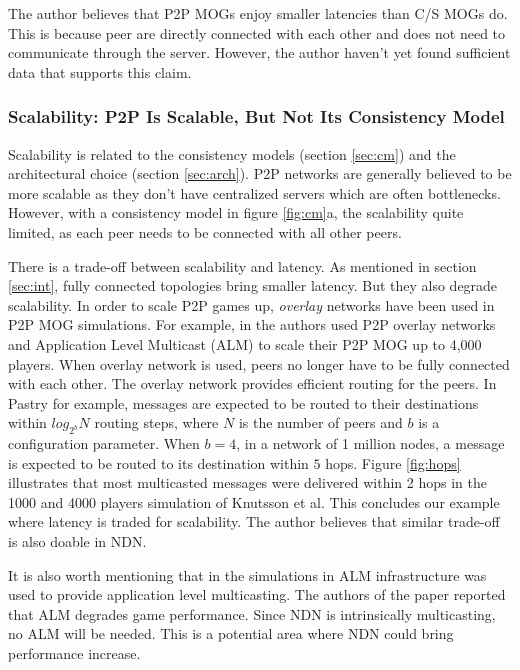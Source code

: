\documentclass{article}
\begin{document}
The author believes that P2P MOGs enjoy smaller latencies than C/S MOGs do. This is because peer are directly connected with each other and does not need to communicate through the server. However, the author haven't yet found sufficient data that supports this claim. 

\subsubsection{Scalability: P2P Is Scalable, But Not Its Consistency Model}
\label{sec:scl}
Scalability is related to the consistency models (section \ref{sec:cm}) and the architectural choice (section \ref{sec:arch}). P2P networks are generally believed to be more scalable as they don't have centralized servers which are often bottlenecks. However, with a consistency model in figure \ref{fig:cm}a, the scalability quite limited, as each peer needs to be connected with all other peers. 

There is a trade-off between scalability and latency. As mentioned in section \ref{sec:int}, fully connected topologies bring smaller latency. But they also degrade scalability. In order to scale P2P games up, \emph{overlay} networks have been used in P2P MOG simulations. For example, in \cite{Knutsson04} the authors used P2P overlay networks and Application Level Multicast (ALM) to scale their P2P MOG up to 4,000 players. When overlay network is used, peers no longer have to be fully connected with each other. The overlay network provides efficient routing for the peers. In Pastry \cite{Lua04} for example, messages are expected to be routed to their destinations within $log_{2^b}N$ routing steps, where $N$ is the number of peers and $b$ is a configuration parameter. When $b = 4$, in a network of 1 million nodes, a message is expected to be routed to its destination within $5$ hops. Figure \ref{fig:hops} illustrates that most multicasted messages were delivered within 2 hops in the 1000 and 4000 players simulation of Knutsson et al. This concludes our example where latency is traded for scalability. The author believes that similar trade-off is also doable in NDN.

It is also worth mentioning that in the simulations in \cite{Knutsson04} ALM infrastructure was used to provide application level multicasting. The authors of the paper reported that ALM degrades game performance. Since NDN is intrinsically multicasting, no ALM will be needed. This is a potential area where NDN could bring performance increase.
\end{document}
